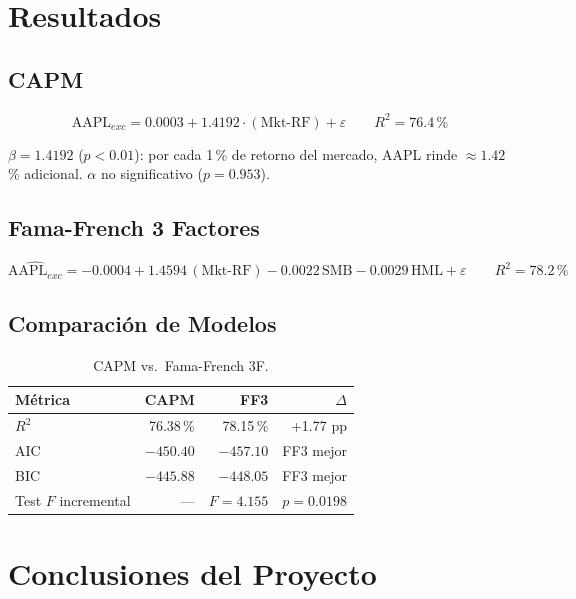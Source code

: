 \documentclass[12pt,letterpaper]{article}
\begin{document}
\section{Resultados}

\subsection{CAPM}

\begin{equation}
  \widehat{\mathrm{AAPL}_{exc}} = 0.0003 + 1.4192\cdot(\text{Mkt-RF}) + \varepsilon
  \qquad R^2 = 76.4\,\%
\end{equation}

$\beta = 1.4192$ ($p < 0.01$): por cada 1\,\% de retorno del mercado, AAPL
rinde $\approx 1.42$\,\% adicional. $\alpha$ no significativo ($p = 0.953$).

\subsection{Fama-French 3 Factores}

\begin{equation}
  \widehat{\mathrm{AAPL}_{exc}} = -0.0004 + 1.4594\,(\text{Mkt-RF})
    - 0.0022\,\text{SMB} - 0.0029\,\text{HML} + \varepsilon
  \qquad R^2 = 78.2\,\%
\end{equation}

\subsection{Comparaci\'on de Modelos}

\begin{table}[h!]
\centering
\begin{tabular}{@{}lrrr@{}}
\toprule
M\'etrica & CAPM & FF3 & $\Delta$ \\
\midrule
$R^2$ & 76.38\,\% & 78.15\,\% & +1.77 pp \\
AIC   & $-450.40$ & $-457.10$ & FF3 mejor \\
BIC   & $-445.88$ & $-448.05$ & FF3 mejor \\
Test $F$ incremental & --- & $F=4.155$ & $p=0.0198$ \\
\bottomrule
\end{tabular}
\caption{CAPM vs.\ Fama-French 3F.}
\end{table}

\section{Conclusiones del Proyecto}
\end{document}
